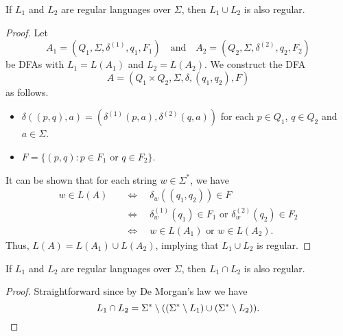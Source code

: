 \begin{theorem}
  \label{thm:regular-union}
  If $L_1$ and $L_2$ are regular languages over $\Sigma$, then $L_1 \cup L_2$
  is also regular.
\end{theorem}
\begin{proof}
  Let
  \begin{equation*}
    A_1 = (Q_1, \Sigma, \delta^{(1)}, q_1, F_1)
    \quad \text{and} \quad
    A_2 = (Q_2, \Sigma, \delta^{(2)}, q_2, F_2)
  \end{equation*}
  be DFAs with $L_1 = L(A_1)$ and $L_2 = L(A_2)$.
  We construct the DFA
  \begin{equation*}
    A = (Q_1 \times Q_2, \Sigma, \delta, (q_1, q_2), F)
  \end{equation*}
  as follows.
  \begin{itemize}
    \item $\delta((p, q), a) = (\delta^{(1)}(p, a), \delta^{(2)}(q, a))$ for
    each $p \in Q_1$, $q \in Q_2$ and $a \in \Sigma$.
    \item $F = \{(p, q): \text{$p \in F_1$ or $q \in F_2$}\}$.
  \end{itemize}
  It can be shown that for each string $w \in \Sigma^*$, we have
  \begin{align*}
    w \in L(A)
    &\quad \Leftrightarrow \quad \delta_w((q_1, q_2)) \in F \\
    &\quad \Leftrightarrow \quad \text{$\delta^{(1)}_w(q_1) \in F_1$ or
    $\delta^{(2)}_w(q_2) \in F_2$} \\
    &\quad \Leftrightarrow \quad \text{$w \in L(A_1)$ or $w \in L(A_2)$}.
  \end{align*}
  Thus, $L(A) = L(A_1) \cup L(A_2)$, implying that $L_1 \cup L_2$ is regular.
\end{proof}

\begin{corollary}
  If $L_1$ and $L_2$ are regular languages over $\Sigma$, then $L_1 \cap L_2$
  is also regular.
\end{corollary}
\begin{proof}
  Straightforward since by De Morgan's law we have
  \begin{equation*}
    L_1 \cap L_2
    = \Sigma^* \setminus
    ((\Sigma^* \setminus L_1) \cup (\Sigma^* \setminus L_2)).
    \qedhere
  \end{equation*}
\end{proof}

